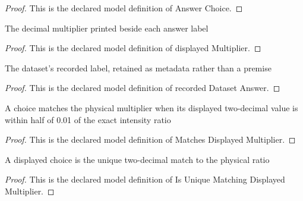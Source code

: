 \begin{proof}
  This is the declared model definition of Answer Choice.
\end{proof}
\begin{definition}
  \label{def:physics:phyx-mini-0163:phyxminiproblems-problemphyxmini0163-displayedmultiplier}
  The decimal multiplier printed beside each answer label
\end{definition}
\begin{proof}
  This is the declared model definition of displayed Multiplier.
\end{proof}
\begin{definition}
  \label{def:physics:phyx-mini-0163:phyxminiproblems-problemphyxmini0163-recordeddatasetanswer}
  The dataset's recorded label, retained as metadata rather than a premise
\end{definition}
\begin{proof}
  This is the declared model definition of recorded Dataset Answer.
\end{proof}
\begin{definition}
  \label{def:physics:phyx-mini-0163:phyxminiproblems-problemphyxmini0163-matchesdisplayedmultiplier}
  A choice matches the physical multiplier when its displayed two-decimal value is within half of 0.01 of the exact intensity ratio
\end{definition}
\begin{proof}
  This is the declared model definition of Matches Displayed Multiplier.
\end{proof}
\begin{definition}
  \label{def:physics:phyx-mini-0163:phyxminiproblems-problemphyxmini0163-isuniquematchingdisplayedmultiplier}
  A displayed choice is the unique two-decimal match to the physical ratio
\end{definition}
\begin{proof}
  This is the declared model definition of Is Unique Matching Displayed Multiplier.
\end{proof}
